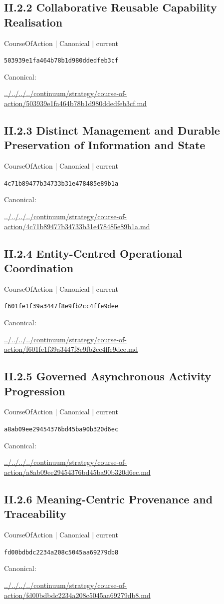 \documentclass[10pt,a4paper]{article}
\begin{document}
\subsection*{II.2.2 Collaborative Reusable Capability Realisation}
{\small CourseOfAction | Canonical | current}\par
\texttt{503939e1fa464b78b1d980ddedfeb3cf}\par
Canonical: \par
{\footnotesize\url{../../../../continuum/strategy/course-of-action/503939e1fa464b78b1d980ddedfeb3cf.md}}\par
\subsection*{II.2.3 Distinct Management and Durable Preservation of Information and State}
{\small CourseOfAction | Canonical | current}\par
\texttt{4c71b89477b34733b31e478485e89b1a}\par
Canonical: \par
{\footnotesize\url{../../../../continuum/strategy/course-of-action/4c71b89477b34733b31e478485e89b1a.md}}\par
\subsection*{II.2.4 Entity-Centred Operational Coordination}
{\small CourseOfAction | Canonical | current}\par
\texttt{f601fe1f39a3447f8e9fb2cc4ffe9dee}\par
Canonical: \par
{\footnotesize\url{../../../../continuum/strategy/course-of-action/f601fe1f39a3447f8e9fb2cc4ffe9dee.md}}\par
\subsection*{II.2.5 Governed Asynchronous Activity Progression}
{\small CourseOfAction | Canonical | current}\par
\texttt{a8ab09ee29454376bd45ba90b320d6ec}\par
Canonical: \par
{\footnotesize\url{../../../../continuum/strategy/course-of-action/a8ab09ee29454376bd45ba90b320d6ec.md}}\par
\subsection*{II.2.6 Meaning-Centric Provenance and Traceability}
{\small CourseOfAction | Canonical | current}\par
\texttt{fd00bdbdc2234a208c5045aa69279db8}\par
Canonical: \par
{\footnotesize\url{../../../../continuum/strategy/course-of-action/fd00bdbdc2234a208c5045aa69279db8.md}}\par
\end{document}
